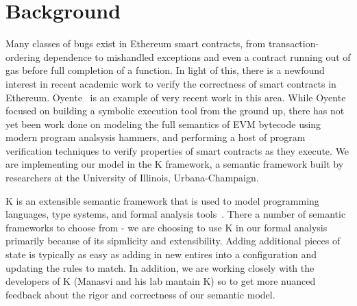 \section{Background}
 Many classes of bugs exist in Ethereum smart contracts, from transaction-ordering dependence to mishandled exceptions and even a contract running out of gas before full completion of a function. In light of this, there is a newfound interest in recent academic work to verify the correctness of smart contracts in Ethereum. Oyente~\cite{luumaking} is an example of very recent work in this area. While Oyente focused on building a symbolic execution tool from the ground up, there has not yet been work done on modeling the full semantics of EVM bytecode using modern program analsysis hammers, and performing a host of program verification techniques to verify properties of smart contracts as they execute. We are implementing our model in the K framework, a semantic framework built by researchers at the University of Illinois, Urbana-Champaign.   
 
 K is an extensible semantic framework that is used to model programming languages, type systems, and formal analysis tools~\cite{rosu-serbanuta-2010-jlap}. There a number of semantic frameworks to choose from - we are choosing to use K in our formal analysis primarily because of its sipmlicity and extensibility. Adding additional pieces of state is typically as easy as adding in new entires into a configuration and updating the rules to match. In addition, we are working closely with the developers of K (Manasvi and his lab mantain K) so to get more nuanced feedback about the rigor and correctness of our semantic model. 

